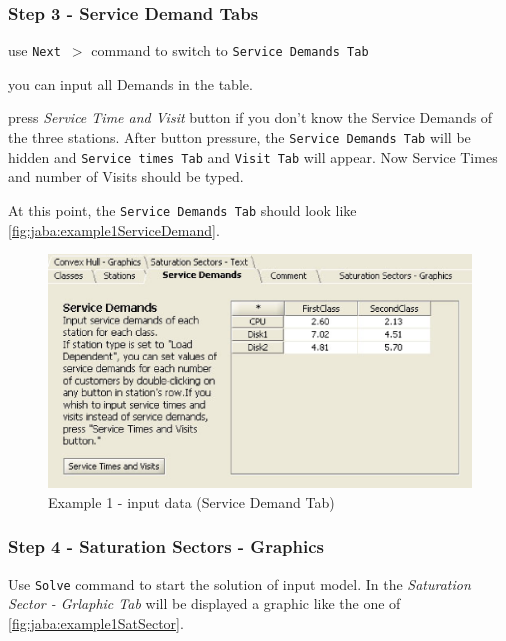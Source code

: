 \subsubsection{Step 3 - Service Demand Tabs}
\begin{itemize*}
\item use \texttt{Next $>$} command to switch to \texttt{Service Demands Tab}
\item you can input all Demands in the table.
\item press \emph{Service Time and Visit} button if you don't know
the Service Demands of the three stations. After button pressure,
the \texttt{Service Demands Tab} will be hidden and \texttt{Service
times Tab} and \texttt{Visit Tab} will appear. Now Service
Times and number of Visits should be typed.
\end{itemize*}

At this point, the \texttt{Service Demands Tab} should look like
\autoref{fig:jaba:example1ServiceDemand}.

\begin{figure}[htbp]
    \begin{center}
        \includegraphics[scale=.75]{img/jaba/example1ServiceDemand}
    \end{center}
    \caption{Example 1 - input data (Service Demand Tab)}
    \label{fig:jaba:example1ServiceDemand}
\end{figure}


\subsubsection{Step 4 - Saturation Sectors - Graphics}


Use \texttt{Solve} command to start the solution of input model.
In the \textit{Saturation Sector - Grlaphic Tab} will be displayed a graphic like the one of
\autoref{fig:jaba:example1SatSector}.

